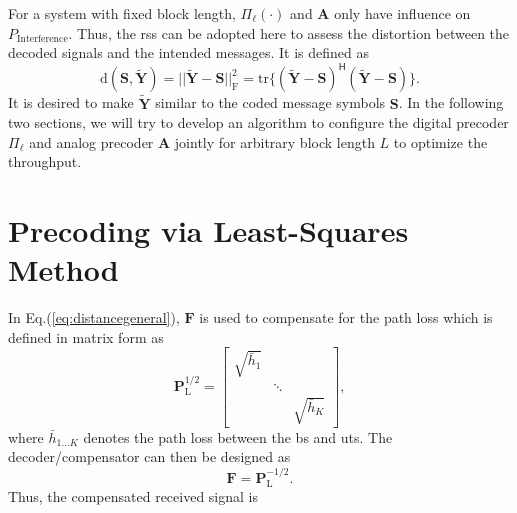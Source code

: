 \documentclass[12pt,draftclsnofoot,onecolumn,journal]{IEEEtran}
\newcommand{\brc}[1]{ \left( #1 \right) }
\begin{document}
For a system with fixed block length, $\Pi_\ell\brc{\cdot}$ and $\mathbf{A}$ only have influence on $P_{\mathrm{Interference}}$. Thus, the \ac{rss} can be adopted here to assess the distortion between the decoded signals and the intended messages. It is defined as
\begin{equation}
\mathrm d(\mathbf S, \tilde{\mathbf Y})=||\tilde{\mathbf Y}-\mathbf S||_{\mathrm{F}}^2=\mathrm{tr}\{(\tilde{\mathbf Y}-\mathbf S)^{\mathsf H}(\tilde{\mathbf Y}-\mathbf S)\}.
\label{eq:distancegeneral}
\end{equation}
 It is desired to make $\tilde{\mathbf Y}$ similar to the coded message symbols $\mathbf S$. In the following two sections, we will try to develop an algorithm to configure the digital precoder $\Pi_\ell$ and analog precoder $\mathbf A$ jointly for arbitrary block length $L$ to optimize the throughput.


\section{Precoding via Least-Squares Method}
In Eq.(\ref{eq:distancegeneral}), $\mathbf F$ is used to compensate for the path loss which is defined in matrix form as
\begin{equation}
\mathbf P_{\mathrm L}^{1/2}=
\begin{bmatrix}
\sqrt{\bar h_1} & & \\
&\ddots & \\
& &\sqrt{\bar h_K}
\end{bmatrix},
\end{equation}
where $\bar h_{1\dots K}$ denotes the path loss between the \ac{bs} and \acp{ut}.
The decoder/compensator can then be designed as 
\begin{equation}
\mathbf F=\mathbf P_{\mathrm L}^{-1/2}.
\end{equation}
Thus, the compensated received signal is
\end{document}
